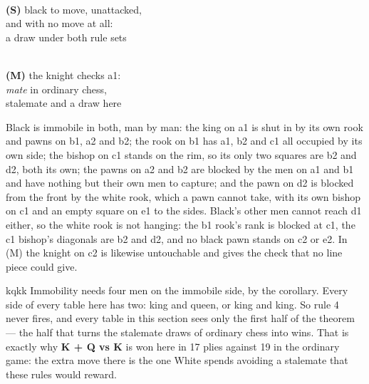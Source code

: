 \documentclass[11pt]{article}
\begin{document}
\begin{center}
\begin{minipage}{0.44\textwidth}\centering
  \\[1.5mm]
  {\small\color{kqkk}\textbf{(S)} black to move, unattacked,\\and with no move at all:
   \\a draw under both rule sets}
\end{minipage}\hspace{0.04\textwidth}
\begin{minipage}{0.44\textwidth}\centering
  \\[1.5mm]
  {\small\color{kqkk}\textbf{(M)} the knight checks a1:\\\emph{mate} in ordinary chess,
   \\stalemate and a draw here}
\end{minipage}
\end{center}

\noindent
Black is immobile in both, man by man: the king on a1 is shut in by its own
rook and pawns on b1, a2 and b2; the rook on b1 has a1, b2 and c1 all occupied
by its own side; the bishop on c1 stands on the rim, so its only two squares
are b2 and d2, both its own; the pawns on a2 and b2 are blocked by the men on
a1 and b1 and have nothing but their own men to capture; and the pawn on d2 is
blocked from the front by the white rook, which a pawn cannot take, with its
own bishop on c1 and an empty square on e1 to the sides. Black's other men
cannot reach d1 either, so the white rook is not hanging: the b1 rook's rank is
blocked at c1, the c1 bishop's diagonals are b2 and d2, and no black pawn
stands on c2 or e2. In (M) the knight on c2 is likewise untouchable and gives
the check that no line piece could give.

\begin{result}[title={None of this can happen to the material in this document}]{kqkk}
Immobility needs four men on the immobile side, by the corollary. Every side of
every table here has two: king and queen, or king and king. So rule 4 never
fires, and every table in this section sees only the first half of the
theorem --- the half that turns the stalemate draws of ordinary chess into
wins. That is exactly why \textbf{K + Q vs K} is won here in 17 plies against
19 in the ordinary game: the extra move there is the one White spends avoiding
a stalemate that these rules would reward.
\end{result}
\end{document}
